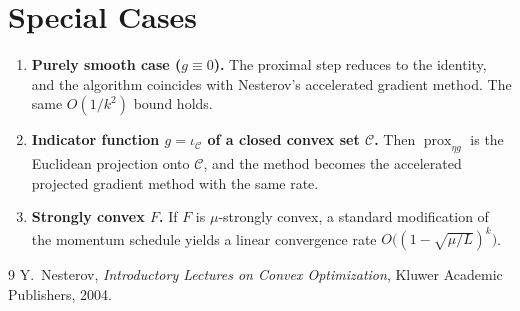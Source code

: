 \documentclass{article}
\newcommand{\prox}{\operatorname{prox}}
\begin{document}
\section*{Special Cases}
\begin{enumerate}
\item \textbf{Purely smooth case ($g\equiv0$).}
The proximal step reduces to the identity, and the algorithm coincides with
Nesterov’s accelerated gradient method. The same $O(1/k^{2})$ bound holds.
\item \textbf{Indicator function $g=\iota_{\mathcal{C}}$ of a closed convex set $\mathcal{C}$.}
Then $\prox_{\eta g}$ is the Euclidean projection onto $\mathcal{C}$, and the method
becomes the accelerated projected gradient method with the same rate.
\item \textbf{Strongly convex $F$.}
If $F$ is $\mu$‑strongly convex, a standard modification of the momentum schedule
yields a linear convergence rate $O\!\bigl((1-\sqrt{\mu/L})^{k}\bigr)$.
\end{enumerate}

\begin{thebibliography}{9}
Y.~Nesterov, \emph{Introductory Lectures on Convex Optimization},
Kluwer Academic Publishers, 2004.
\end{thebibliography}
\end{document}
